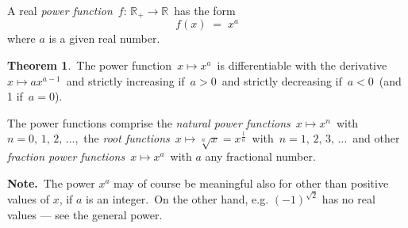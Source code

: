 \documentclass[12pt]{article}
\theoremstyle{definition}
\newtheorem*{thmplain}{Theorem}
\begin{document}
A real {\em power function} \,$f\!:\,\mathbb{R}_+\to\mathbb{R}$\, has the form
 $$f(x) \;=\; x^a$$
where $a$ is a given real number.

\begin{thmplain}
 \,The power function\, $x\mapsto x^a$\, is differentiable with the derivative \,$x\mapsto ax^{a-1}$\, and strictly increasing if\, $a > 0$\, and strictly decreasing if\, $a < 0$\, (and  1 if\, 
$a = 0$).
\end{thmplain}

The power functions comprise the {\em natural power functions}\, $x\mapsto x^n$\, with\, $n = 0,\,1,\,2,\,\ldots$,\, the {\em root functions}\, $x\mapsto \sqrt[n]{x} = x^{\frac{1}{n}}$\, with\, $n = 1,\,2,\,3,\,\ldots$\, and other {\em fraction power functions}\, $x\mapsto x^a$\, with $a$ any fractional number.



\textbf{Note.} \,The power $x^a$ may of course be meaningful also for other than positive values of $x$, if $a$ is an integer.\, On the other hand, e.g. $(-1)^{\sqrt{2}}$ has no real values --- see the general power.
\end{document}
